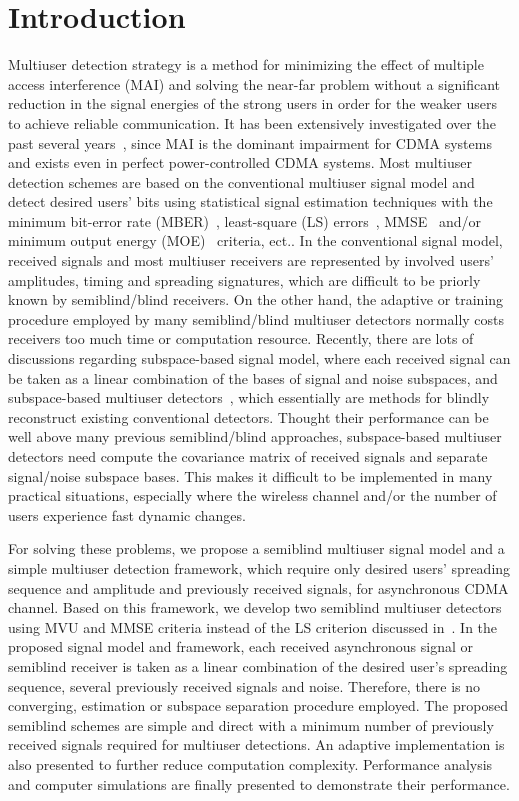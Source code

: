 \documentclass[a4paper,10pt,fleqn, twocolumn]{IEEETran}
\begin{document}
\section{Introduction}
Multiuser detection strategy is a method for minimizing the effect
of multiple access interference (MAI) and solving the near-far
problem without a significant reduction in the signal energies of
the strong users in order for the weaker users to achieve reliable
communication. It has been extensively investigated over the past
several years~\cite{Verd98}, since MAI is the dominant impairment
for CDMA systems and exists even in perfect power-controlled CDMA
systems. Most multiuser detection schemes are based on the
conventional multiuser signal model and detect desired users' bits
using statistical signal estimation techniques with the minimum
bit-error rate (MBER)~\cite{Verd86,Verd89}, least-square (LS)
errors~\cite{Lupa89}, MMSE~\cite{Lupa89,Honi95} and/or minimum
output energy (MOE)~\cite{Honi95} criteria, ect.. In the
conventional signal model, received signals and most multiuser
receivers are represented by involved users' amplitudes, timing
and spreading signatures, which are difficult to be priorly known
by semiblind/blind receivers. On the other hand, the adaptive or
training procedure employed by many semiblind/blind multiuser
detectors normally costs receivers too much time or computation
resource. Recently, there are lots of discussions regarding
subspace-based signal model, where each received signal can be
taken as a linear combination of the bases of signal and noise
subspaces, and subspace-based multiuser
detectors~\cite{Yang95,Wang98,Wang99}, which essentially are
methods for blindly reconstruct existing conventional detectors.
Thought their performance can be well above many previous
semiblind/blind approaches, subspace-based multiuser detectors
need compute the covariance matrix of received signals and
separate signal/noise subspace bases. This makes it difficult to
be implemented in many practical situations, especially where the
wireless channel and/or the number of users experience fast
dynamic changes.

For solving these problems, we propose a semiblind multiuser
signal model and a simple multiuser detection framework, which
require only desired users' spreading sequence and amplitude and
previously received signals, for asynchronous CDMA channel. Based
on this framework, we develop two semiblind multiuser detectors
using MVU and MMSE criteria instead of the LS criterion discussed
in~\cite{Wang03d,Wang03e}. In the proposed signal model and
framework, each received asynchronous signal or semiblind receiver
is taken as a linear combination of the desired user's spreading
sequence, several previously received signals and noise.
Therefore, there is no converging, estimation or subspace
separation procedure employed. The proposed semiblind schemes are
simple and direct with a minimum number of previously received
signals required for multiuser detections. An adaptive
implementation is also presented to further reduce computation
complexity. Performance analysis and computer simulations are
finally presented to demonstrate their performance.
\end{document}
